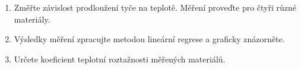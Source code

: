 \documentclass[protokol.tex]{subfiles}
\begin{document}
\begin{enumerate}
\item Změřte závislost prodloužení tyče na teplotě. Měření proveďte pro čtyři různé materiály.
\item Výsledky měření zpracujte metodou lineární regrese a graficky znázorněte.
\item Určete koeficient teplotní roztažnosti měřených materiálů.

\end{enumerate}
\end{document}
